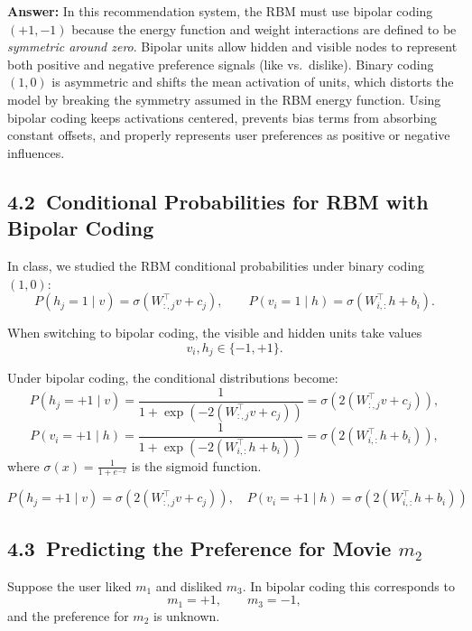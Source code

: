 \documentclass{article}
\begin{document}
\textbf{Answer:}  
In this recommendation system, the RBM must use bipolar coding \((+1,-1)\) because the energy function and weight interactions are defined to be \emph{symmetric around zero}. 
Bipolar units allow hidden and visible nodes to represent both positive and negative preference signals (like vs.\ dislike).  
Binary coding \((1,0)\) is asymmetric and shifts the mean activation of units, which distorts the model by breaking the symmetry assumed in the RBM energy function. 
Using bipolar coding keeps activations centered, prevents bias terms from absorbing constant offsets, and properly represents user preferences as positive or negative influences.

\begin{center}
\end{center}

\subsection*{4.2\ Conditional Probabilities for RBM with Bipolar Coding}

In class, we studied the RBM conditional probabilities under binary coding \((1,0)\):
\[
P(h_j = 1 \mid v) = \sigma(W_{:,j}^{\top}v + c_j), \qquad
P(v_i = 1 \mid h) = \sigma(W_{i,:}^{\top}h + b_i).
\]

When switching to bipolar coding, the visible and hidden units take values
\[
v_i, h_j \in \{-1, +1\}.
\]

Under bipolar coding, the conditional distributions become:
\[
P(h_j = +1 \mid v)
= \frac{1}{1 + \exp\!\left(-2(W_{:,j}^{\top}v + c_j)\right)}
= \sigma\!\left(2(W_{:,j}^{\top}v + c_j)\right),
\]
\[
P(v_i = +1 \mid h)
= \frac{1}{1 + \exp\!\left(-2(W_{i,:}^{\top}h + b_i)\right)}
= \sigma\!\left(2(W_{i,:}^{\top}h + b_i)\right),
\]
where \(\sigma(x) = \frac{1}{1 + e^{-x}}\) is the sigmoid function.

\[
\boxed{
P(h_j=+1\mid v)=\sigma(2(W_{:,j}^\top v+c_j)), \quad
P(v_i=+1\mid h)=\sigma(2(W_{i,:}^\top h+b_i))
}
\]

\subsection*{4.3\ Predicting the Preference for Movie \(m_2\)}

Suppose the user liked \(m_1\) and disliked \(m_3\). In bipolar coding this corresponds to
\[
m_1 = +1, \qquad m_3 = -1,
\]
and the preference for \(m_2\) is unknown.
\end{document}
